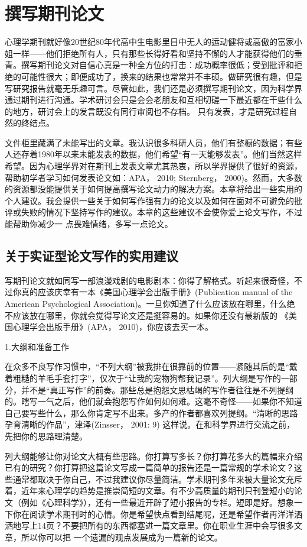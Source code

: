 \chapter{撰写期刊论文}
心理学期刊就好像20世纪80年代高中生电影里目中无人的运动健将或高傲的富家小姐一样——他们拒绝所有人，只有那些长得好看和坚持不懈的人才能获得他们的垂青。撰写期刊论文对自信心真是一种全方位的打击：成功概率很低；受到批评和拒绝的可能性很大；即便成功了，换来的结果也常常并不丰硕。做研究很有趣，但是写研究报告就毫无乐趣可言。尽管如此，我们还是必须撰写期刊论文，因为科学界通过期刊进行沟通。学术研讨会只是会会老朋友和互相切磋一下最近都在干些什么的地方，研讨会上的发言既没有同行审阅也不存档。 只有发表，才是研究过程自然的终结点。

文件柜里藏满了未能写出的文章。我认识很多科研人员，他们有整橱的数据；有些人还存着1980年以来未能发表的数据，他们希望“有一天能够发表”。他们当然这样希望。因为心理学界对在期刊上发表文章尤其热衷，所以学界提供了很好的资源，帮助初学者学习如何发表论文如：APA， 2010; Sternberg， 2000)。然而，大多数的资源都没能提供关于如何提高撰写论文动力的解决方案。本章将给出一些实用的个人建议。我会提供一些关于如何写作强有力的论文以及如何在面对不可避免的批评或失败的情况下坚持写作的建议。本章的这些建议不会使你爱上论文写作，不过能帮助你减少一
点畏难情绪，多写一点论文。

\section{关于实证型论文写作的实用建议}
写期刊论文就如同写一部浪漫戏剧的电影剧本：你得了解格式。听起来很奇怪，不过你真的应该庆幸有一本《美国心理学会出版手册》(Publication manual of the American Psychological Association)。一旦你知道了什么应该放在哪里，什么绝不应该放在哪里，你就会觉得写论文还是挺容易的。如果你还没有最新版的 《美国心理学会出版手册》(APA， 2010)，你应该去买一本。

{\kaishu 1.大纲和准备工作}

在众多不良写作习惯中，“不列大纲”被我排在很靠前的位置——紧随其后的是“戴着粗糙的羊毛手套打字”，仅次于“让我的宠物狗帮我记录”。列大纲是写作的一部分，并不是“真正写作”的前奏。那些总是抱怨文思枯竭的写作者往往是不列提纲的。瞎写一气之后，他们就会抱怨写作如何如何难。这毫不奇怪——如果你不知道自己要写些什么，那么你肯定写不出来。多产的作者都喜欢列提纲。“清晰的思路孕育清晰的作品”，津泽(Zinsser， 2001: 9) 这样说。在和科学界进行交流之前，先把你的思路理清楚。

列大纲能够让你对论文大概有些思路。你打算写多长？你打算花多大的篇幅来介绍已有的研究？你打算把这篇论文写成一篇简单的报告还是一篇常规的学术论文？这些通常都取决于你自己，不过我建议你尽量简洁。学术期刊多年来被大量论文充斥着，近年来心理学的趋势是推崇简短的文章。有不少高质量的期刊只刊登短小的论文（例如《心理科学》），还有一些最近开辟了短小报告的专栏。短即是好。想象一下你在阅读学术期刊时的心情。你是希望快点看到结尾呢，还是希望作者再洋洋洒洒地写上14页？不要把所有的东西都塞进一篇文章里。你在职业生涯中会写很多文章，所以你可以把
一个遗漏的观点发展成为一篇新的论文。

